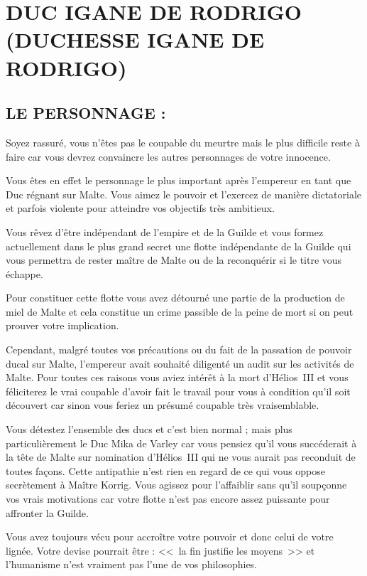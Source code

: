 \documentclass[14pt,twocolumn]{extarticle}
\begin{document}
\section{DUC IGANE DE RODRIGO\\(DUCHESSE IGANE DE RODRIGO)}

\subsection{LE PERSONNAGE :}

Soyez rassuré, vous n'êtes pas le coupable du meurtre mais le plus difficile
reste à faire car vous devrez convaincre les autres personnages de votre
innocence.

Vous êtes en effet le personnage le plus important après l'empereur en tant que
Duc régnant sur Malte. Vous aimez le pouvoir et l'exercez de manière
dictatoriale et parfois violente pour atteindre vos objectifs très ambitieux.

Vous rêvez d'être indépendant de l'empire et de la Guilde et vous formez
actuellement dans le plus grand secret une flotte indépendante de la Guilde qui
vous permettra de rester maître de Malte ou de la reconquérir si le titre vous
échappe.

Pour constituer cette flotte vous avez détourné une partie de la production de
miel de Malte et cela constitue un crime passible de la peine de mort si on
peut prouver votre implication.

Cependant, malgré toutes vos précautions ou du fait de la passation de pouvoir
ducal sur Malte, l'empereur avait souhaité diligenté un audit sur les activités
de Malte. Pour toutes ces raisons vous aviez intérêt à la mort d'Hélios~III et
vous féliciterez le vrai coupable d'avoir fait le travail pour vous à condition
qu'il soit découvert car sinon vous feriez un présumé coupable très
vraisemblable.

Vous détestez l'ensemble des ducs et c'est bien normal ; mais plus
particulièrement le Duc Mika de Varley car vous pensiez qu'il vous succéderait
à la tête de Malte sur nomination d'Hélios~III qui ne vous aurait pas reconduit
de toutes façons. Cette antipathie n'est rien en regard de ce qui vous oppose
secrètement à Maître Korrig. Vous agissez pour l'affaiblir sans qu'il soupçonne
vos vrais motivations car votre flotte n'est pas encore assez puissante pour
affronter la Guilde.

Vous avez toujours vécu pour accroître votre pouvoir et donc celui de votre
lignée. Votre devise pourrait être : <<~la fin justifie les moyens~>> et
l'humanisme n'est vraiment pas l'une de vos philosophies.
\end{document}
